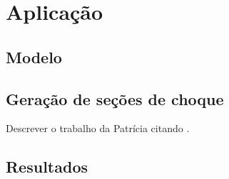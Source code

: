 \chapter{Aplicação}
\label{chap:aplicacao}


\section{Modelo}


\section{Geração de seções de choque}

Descrever o trabalho da Patrícia citando \cite{Reis2015}.

\section{Resultados}
\label{sec:ferr}

